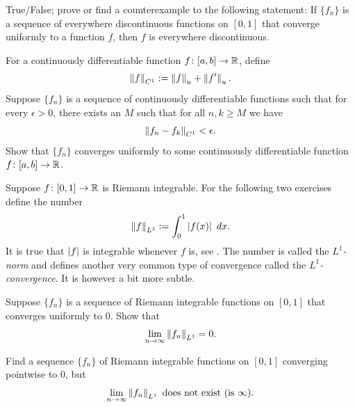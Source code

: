 \begin{exercise}
True/False; prove or find a counterexample to the following statement:
If $\{ f_n \}$ is a sequence of everywhere discontinuous functions on $[0,1]$
that converge uniformly to a function $f$, then $f$ is everywhere
discontinuous.
\end{exercise}

\begin{exercise} \label{c1uniflim:exercise}
For a continuously differentiable function $f \colon [a,b] \to {\mathbb{R}}$, define
\begin{equation*}
\left\lVert {f} \right\rVert_{C^1} := \left\lVert {f} \right\rVert_u + \left\lVert {f'} \right\rVert_u .
\end{equation*}
Suppose $\{ f_n \}$ is a sequence of continuously differentiable
functions such that for every $\epsilon >0$, there exists an $M$
such that for all $n,k \geq M$ we have
\begin{equation*}
\left\lVert {f_n-f_k} \right\rVert_{C^1} < \epsilon .
\end{equation*}
Show that $\{ f_n \}$ converges uniformly to some continuously differentiable
function $f \colon [a,b] \to {\mathbb{R}}$.
\end{exercise}

\begin{exnote}
Suppose 
$f \colon [0,1] \to {\mathbb{R}}$ is Riemann integrable.
For the following two exercises define 
the number
\begin{equation*}
\left\lVert {f} \right\rVert_{L^1} := 
\int_0^1 \left\lvert {f(x)} \right\rvert~dx .
\end{equation*}
It is true that $\left\lvert {f} \right\rvert$ is integrable whenever $f$ is, see
.
The number is called the \emph{$L^1$-norm} and
defines another very common type of
convergence called the
\emph{$L^1$-convergence}.
It is however a bit more subtle.
\end{exnote}

\begin{exercise}
Suppose $\{ f_n \}$ is a sequence of Riemann integrable functions on $[0,1]$
that converges uniformly
to $0$.  Show that
\begin{equation*}
\lim_{n\to\infty} \left\lVert {f_n} \right\rVert_{L^1} = 0 .
\end{equation*}
\end{exercise}

\begin{exercise}
Find a sequence $\{ f_n \}$ of Riemann integrable functions 
on $[0,1]$ converging pointwise to $0$, but
\begin{equation*}
\lim_{n\to\infty} \left\lVert {f_n} \right\rVert_{L^1} \text{ does not exist (is } \infty\text{)}.
\end{equation*}
\end{exercise}

